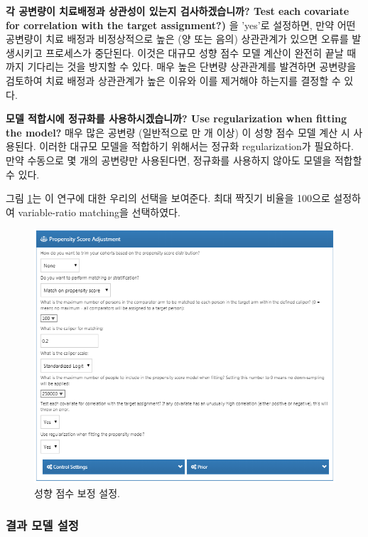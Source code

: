 \documentclass[11pt]{book}
\theoremstyle{definition}
\theoremstyle{definition}
\theoremstyle{definition}
\theoremstyle{remark}
\begin{document}
\textbf{각 공변량이 치료배정과 상관성이 있는지 검사하겠습니까? Test each
covariate for correlation with the target assignment?)} 을 'yes'로
설정하면, 만약 어떤 공변량이 치료 배정과 비정상적으로 높은 (양 또는
음의) 상관관계가 있으면 오류를 발생시키고 프로세스가 중단된다. 이것은
대규모 성향 점수 모델 계산이 완전히 끝날 때까지 기다리는 것을 방지할 수
있다. 매우 높은 단변량 상관관계를 발견하면 공변량을 검토하여 치료 배정과
상관관계가 높은 이유와 이를 제거해야 하는지를 결정할 수 있다.

\textbf{모델 적합시에 정규화를 사용하시겠습니까? Use regularization when
fitting the model?} 매우 많은 공변량 (일반적으로 만 개 이상) 이 성향
점수 모델 계산 시 사용된다. 이러한 대규모 모델을 적합하기 위해서는
정규화 regularization가 필요하다. 만약 수동으로 몇 개의 공변량만
사용된다면, 정규화를 사용하지 않아도 모델을 적합할 수 있다.

그림 \ref{fig:psSettings}는 이 연구에 대한 우리의 선택을 보여준다. 최대
짝짓기 비율을 100으로 설정하여 variable-ratio matching을 선택하였다.

\begin{figure}

{\centering \includegraphics[width=1\linewidth]{images/PopulationLevelEstimation/psSettings} 

}

\caption{성향 점수 보정 설정.}\label{fig:psSettings}
\end{figure}

\subsubsection*{결과 모델 설정}\label{--}
\end{document}
